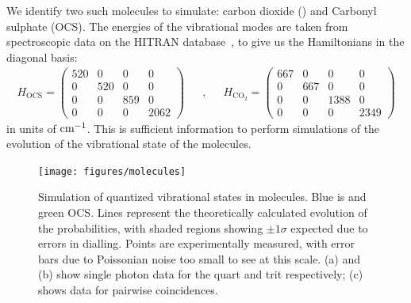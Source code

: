 We identify two such molecules to simulate: carbon dioxide (\co{}) and Carbonyl
sulphate (OCS). The energies of the vibrational modes are taken from
spectroscopic data on the HITRAN database~\cite{hitran}, to give us the
Hamiltonians in the diagonal basis:
\begin{align}
  H_{\text{OCS}} = \begin{pmatrix}
    520 & 0 & 0 & 0 \\
    0 & 520 & 0 & 0 \\
    0 & 0 & 859 & 0 \\
    0 & 0 & 0 & 2062 \end{pmatrix} && , && H_{\text{CO}_{2}} = \begin{pmatrix}
    667 & 0 & 0 & 0 \\
    0 & 667 & 0 & 0 \\
    0 & 0 & 1388 & 0 \\
    0 & 0 & 0 & 2349 \end{pmatrix}
\end{align}
in units of \(\text{cm}^{-1}\). This is sufficient information to perform simulations
of the evolution of the vibrational state of the molecules.

\begin{figure}
  \centering
  \texttt{[image: figures/molecules]}
  \caption[Simulation of quantized vibrational states in molecules]
  {Simulation of quantized vibrational states in molecules. Blue is \co{} and
  green OCS. Lines represent the theoretically calculated evolution of the
  probabilities, with shaded regions showing \(\pm 1 \sigma\) expected due to
  errors in dialling. Points are experimentally measured, with error bars due to
  Poissonian noise too small to see at this scale. (a) and (b) show single
  photon data for the quart and trit respectively; (c) shows data for
  pairwise coincidences.}
  \label{fig:molecules}
\end{figure}

